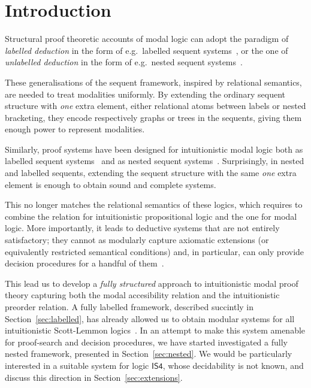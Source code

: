 \documentclass[twoside]{aiml20}
\begin{document}
\section{Introduction}
Structural proof theoretic accounts of modal logic can adopt the paradigm of \emph{labelled deduction} in the form of e.g.~labelled sequent systems~\cite{vigano2000,negri2005}, or the one of \emph{unlabelled deduction} in the form of e.g.~nested sequent systems~\cite{brunnler2009deep,poggiolesi2009method}.

These generalisations of the sequent framework, inspired by relational semantics, are needed to treat modalities uniformly. 
%
By extending the ordinary sequent structure with \emph{one} extra element, either relational atoms between labels or nested bracketing, they encode respectively graphs or trees in the sequents, giving them enough power to represent modalities. 

Similarly, proof systems have been designed for intuitionistic modal logic both as labelled sequent systems~\cite{simpson1994} and as nested sequent systems~\cite{strassburger2013,kuznets:strassburger:maehara,galmiche2018}.
%
Surprisingly, in nested and labelled sequents, extending the sequent structure with the same \emph{one} extra element is enough to obtain sound and complete systems.
%

This no longer matches the relational semantics of these logics, which requires to combine the relation for intuitionistic propositional logic and the one for modal logic. 
%
More importantly, it leads to deductive systems that are not entirely satisfactory; they cannot as modularly capture axiomatic extensions (or equivalently restricted semantical conditions) and, in particular, can only provide decision procedures for a handful of them~\cite{simpson1994}.

This lead us to develop a \emph{fully structured} approach to intuitionistic modal proof theory capturing both the modal accesibility relation and the intuitionistic preorder relation. 
%
A fully labelled framework, described succintly in Section~\ref{sec:labelled}, has already allowed us to obtain modular systems for all intuitionistic Scott-Lemmon logics~\cite{marin:morales:strassburger:hal}. 
%
In an attempt to make this system amenable for proof-search and decision procedures, we have started investigated a fully nested framework, presented in Section~\ref{sec:nested}.
%
We would be particularly interested in a suitable system for logic $\mathsf{IS4}$, whose decidability is not known, and discuss this direction in Section~\ref{sec:extensions}.
\end{document}
